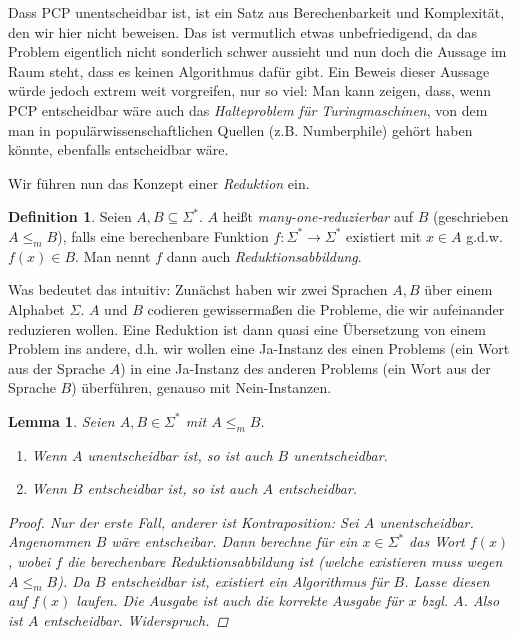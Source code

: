 \documentclass[11pt, a4paper]{article}
\theoremstyle{definition}
\newtheorem{definition}{Definition}
\theoremstyle{plain}
\newtheorem*{lemma*}{Lemma}
\begin{document}
Dass \textsc{PCP} unentscheidbar ist, ist ein Satz aus Berechenbarkeit und Komplexität, den wir hier nicht beweisen. Das ist vermutlich etwas unbefriedigend, da das Problem eigentlich nicht sonderlich schwer aussieht und nun doch die Aussage im Raum steht, dass es keinen Algorithmus dafür gibt. Ein Beweis dieser Aussage würde jedoch extrem weit vorgreifen, nur so viel: Man kann zeigen, dass, wenn \textsc{PCP} entscheidbar wäre auch das \textit{Halteproblem für Turingmaschinen}, von dem man in populärwissenschaftlichen Quellen (z.B. Numberphile) gehört haben könnte, ebenfalls entscheidbar wäre.

Wir führen nun das Konzept einer \textit{Reduktion} ein.
\begin{definition}
	Seien $A, B \subseteq \Sigma^\ast$. $A$ heißt \textit{many-one-reduzierbar} auf $B$ (geschrieben $A \leq_m B$), falls eine berechenbare Funktion $f\colon \Sigma^\ast \to \Sigma^\ast$ existiert mit $x \in A$ g.d.w. $f(x) \in B$. Man nennt $f$ dann auch \textit{Reduktionsabbildung}.
\end{definition}
Was bedeutet das intuitiv: Zunächst haben wir zwei Sprachen $A, B$ über einem Alphabet $\Sigma$. $A$ und $B$ codieren gewissermaßen die Probleme, die wir aufeinander reduzieren wollen. Eine Reduktion ist dann quasi eine Übersetzung von einem Problem ins andere, d.h. wir wollen eine Ja-Instanz des einen Problems (ein Wort aus der Sprache $A$) in eine Ja-Instanz des anderen Problems (ein Wort aus der Sprache $B$) überführen, genauso mit Nein-Instanzen.
\begin{lemma*}
	Seien $A, B \in \Sigma^\ast$ mit $A \leq_m B$.
	\begin{enumerate}
		\item Wenn $A$ unentscheidbar ist, so ist auch $B$ unentscheidbar.
		\item Wenn $B$ entscheidbar ist, so ist auch $A$ entscheidbar.
	\end{enumerate}
	\begin{proof}
		Nur der erste Fall, anderer ist Kontraposition: Sei $A$ unentscheidbar. Angenommen $B$ wäre entscheibar. Dann berechne für ein $x \in \Sigma^\ast$ das Wort $f(x)$, wobei $f$ die berechenbare Reduktionsabbildung ist (welche existieren muss wegen $A \leq_m B$). Da $B$ entscheidbar ist, existiert ein Algorithmus für $B$. Lasse diesen auf $f(x)$ laufen. Die Ausgabe ist auch die korrekte Ausgabe für $x$ bzgl. $A$. Also ist $A$ entscheidbar. Widerspruch.
	\end{proof}
\end{lemma*}
\end{document}
